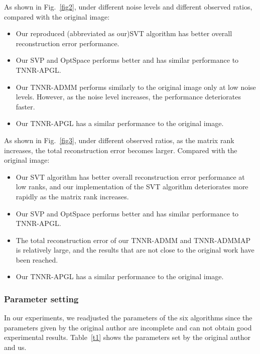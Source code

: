 \documentclass{article}
\begin{document}
{As shown in Fig.~\ref{fig2}, under different noise levels and different observed ratios, compared with the original image:
\begin{itemize}
    \item Our reproduced (abbreviated as our)SVT algorithm has better overall reconstruction error performance.
    
    \item Our SVP and OptSpace performs better and has similar performance to TNNR-APGL.
    
    \item Our TNNR-ADMM performs similarly to the original image only at low noise levels. However, as the noise level increases, the performance deteriorates faster.
    
    \item Our TNNR-APGL has a similar performance to the original image.
\end{itemize}

As shown in Fig.~\ref{fig3}, under different observed ratios, as the
matrix rank increases, the total reconstruction error becomes larger. Compared with the original image:
\begin{itemize}
    \item Our SVT algorithm has better overall reconstruction error performance at low ranks, and our implementation of the SVT algorithm deteriorates more rapidly as the matrix rank increases.
    
    \item Our SVP and OptSpace performs better and has similar performance to TNNR-APGL.
    
    \item The total reconstruction error of our TNNR-ADMM and TNNR-ADMMAP is relatively large, and the results that are not close to the original work have been reached.
    
    \item Our TNNR-APGL has a similar performance to the original image.
\end{itemize}


\subsubsection{Parameter setting}
In our experiments, we readjusted the parameters of the six algorithms since the parameters given by the original author are incomplete and can not obtain good experimental results. Table~\ref{t1} shows the parameters set by the original author and us.

}
\end{document}
